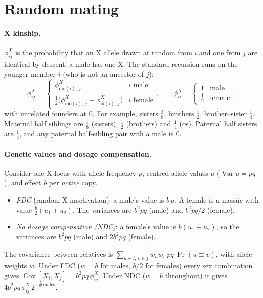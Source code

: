\documentclass[11pt]{article}
\newcommand{\Cov}{\operatorname{Cov}}
\newcommand{\Var}{\operatorname{Var}}
\begin{document}
\section{Random mating}\label{sec:rm}
\paragraph{X kinship.} $\phi^X_{ij}$ is the probability that an X allele drawn at random from $i$ and one from
$j$ are identical by descent; a male has one X. The standard recursion runs on the younger member $i$ (who is
not an ancestor of $j$):
\[
\phi^X_{ij}=\begin{cases}\phi^X_{\mathrm{mo}(i),\,j} & i\text{ male}\\[2pt]
\tfrac12\big(\phi^X_{\mathrm{mo}(i),\,j}+\phi^X_{\mathrm{fa}(i),\,j}\big) & i\text{ female}\end{cases},
\qquad \phi^X_{ii}=\begin{cases}1 & \text{male}\\ \tfrac12 & \text{female}\end{cases},
\]
with unrelated founders at $0$. For example, sisters $\tfrac38$, brothers $\tfrac12$, brother--sister
$\tfrac14$. Maternal half siblings are $\tfrac18$ (sisters), $\tfrac12$ (brothers) and $\tfrac14$ (os).
Paternal half sisters are $\tfrac14$, and any paternal half-sibling pair with a male is $0$.

\paragraph{Genetic values and dosage compensation.} Consider one X locus with allele frequency $p$, centred
allele values $u$ ($\Var u=pq$), and effect $b$ per \emph{active} copy.
\begin{itemize}
  \item \emph{FDC} (random X inactivation): a male's value is $b\,u$. A female is a mosaic with value
    $\tfrac b2(u_1+u_2)$. The variances are $b^2pq$ (male) and $b^2pq/2$ (female).
  \item \emph{No dosage compensation (NDC)}: a female's value is $b(u_1+u_2)$, so the variances are $b^2pq$
    (male) and $2b^2pq$ (female).
\end{itemize}
The covariance between relatives is $\sum_{u\in i,\,v\in j}w_uw_v\,pq\,\Pr(u\equiv v)$, with allele weights
$w$. Under FDC ($w=b$ for males, $b/2$ for females) every sex combination gives $\Cov[X_i,X_j]=b^2pq\,
\phi^X_{ij}$. Under NDC ($w=b$ throughout) it gives $4b^2pq\,\phi^X_{ij}\,2^{-\#\text{males}}$.
\end{document}
